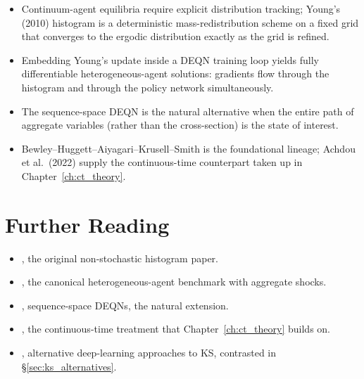 \documentclass[11pt,a4paper]{report}
\begin{document}
\begin{keyinsightbox}
\begin{itemize}[itemsep=2pt, leftmargin=*]
\item Continuum-agent equilibria require explicit distribution tracking; Young's (2010) histogram is a deterministic mass-redistribution scheme on a fixed grid that converges to the ergodic distribution exactly as the grid is refined.
\item Embedding Young's update inside a DEQN training loop yields fully differentiable heterogeneous-agent solutions: gradients flow through the histogram and through the policy network simultaneously.
\item The sequence-space DEQN \citep{azinovicyangzemlicka2025sequencespace} is the natural alternative when the entire path of aggregate variables (rather than the cross-section) is the state of interest.
\item Bewley--Huggett--Aiyagari--Krusell--Smith is the foundational lineage; Achdou et al.\ (2022) supply the continuous-time counterpart taken up in Chapter~\ref{ch:ct_theory}.
\end{itemize}
\end{keyinsightbox}

\section*{Further Reading}
\begin{itemize}[itemsep=2pt]
\item \citet{young2010}, the original non-stochastic histogram paper.
\item \citet{krusell1998income}, the canonical heterogeneous-agent benchmark with aggregate shocks.
\item \citet{azinovicyangzemlicka2025sequencespace}, sequence-space DEQNs, the natural extension.
\item \citet{achdou2022income}, the continuous-time treatment that Chapter~\ref{ch:ct_theory} builds on.
\item \citet{maliar2021deep, han2023deepham}, alternative deep-learning approaches to KS, contrasted in \S\ref{sec:ks_alternatives}.
\end{itemize}
\end{document}
